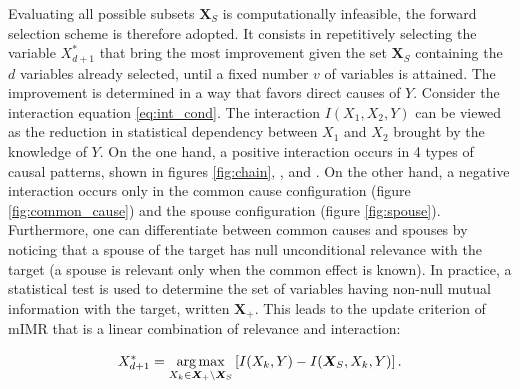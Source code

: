 Evaluating all possible subsets $\bm X_S$ is computationally infeasible, the
forward selection scheme is therefore adopted. It consists in repetitively
selecting the variable $X_{d+1}^*$ that bring the most improvement given the set
$\bm X_S$ containing the $d$ variables already selected, until a fixed number
$v$ of variables is attained. The improvement is determined in a way that favors
direct causes of $Y$. Consider the interaction equation \ref{eq:int_cond}. The
interaction $I(X_1, X_2, Y)$ can be viewed as the reduction in statistical
dependency between $X_1$ and $X_2$ brought by the knowledge of $Y$. On the one
hand, a positive interaction occurs in 4 types of causal patterns, shown in
figures \ref{fig:chain}, ,  and
. On the other hand, a negative interaction occurs only
in the common cause configuration (figure \ref{fig:common_cause}) and the spouse
configuration (figure \ref{fig:spouse}). Furthermore, one can differentiate
between common causes and spouses by noticing that a spouse of the target has
null unconditional relevance with the target (a spouse is relevant only when the
common effect is known). In practice, a statistical test is used to determine
the set of variables having non-null mutual information with the target, written
$\bm X_+$. This leads to the update criterion of mIMR that is a linear
combination of relevance and interaction:

\begin{equation}
    X_{d+1}^* = \operatorname*{arg\,max}_{X_k\in\bm X_+ \setminus \bm X_S}
    \left[ I(X_k,Y) - I(\bm X_S, X_k, Y)\right].
\end{equation}

